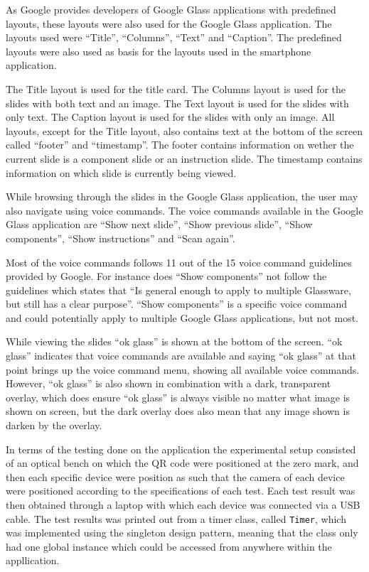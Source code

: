 As Google provides developers of Google Glass applications with predefined layouts, these layouts were also used for the Google Glass application. The layouts used were ``Title'', ``Columns'', ``Text'' and ``Caption''. The predefined layouts were also used as basis for the layouts used in the smartphone application.

The Title layout is used for the title card. The Columns layout is used for the slides with both text and an image. The Text layout is used for the slides with only text. The Caption layout is used for the slides with only an image. All layouts, except for the Title layout, also contains text at the bottom of the screen called ``footer'' and ``timestamp''. The footer contains information on wether the current slide is a component slide or an instruction slide. The timestamp contains information on which slide is currently being viewed.

While browsing through the slides in the Google Glass application, the user may also navigate using voice commands. The voice commands available in the Google Glass application are ``Show next slide'', ``Show previous slide'', ``Show components'', ``Show instructions'' and ``Scan again''.

Most of the voice commands follows 11 out of the 15 voice command guidelines provided by Google. For instance does ``Show components'' not follow the guidelines which states that ``Is general enough to apply to multiple Glassware, but still has a clear purpose''. ``Show components'' is a specific voice command and could potentially apply to multiple Google Glass applications, but not most.

While viewing the slides ``ok glass'' is shown at the bottom of the screen. ``ok glass'' indicates that voice commands are available and saying ``ok glass'' at that point brings up the voice command menu, showing all available voice commands. However, ``ok glass'' is also shown in combination with a dark, transparent overlay, which does ensure ``ok glass'' is always visible no matter what image is shown on screen, but the dark overlay does also mean that any image shown is darken by the overlay.

In terms of the testing done on the application the experimental setup consisted of an optical bench on which the QR code were positioned at the zero mark, and then each specific device were position as such that the camera of each device were positioned according to the specifications of each test. Each test result was then obtained through a laptop with which each device was connected via a USB cable. The test results was printed out from a timer class, called \texttt{Timer}, which was implemented using the singleton design pattern, meaning that the class only had one global instance which could be accessed from anywhere within the appllication.

